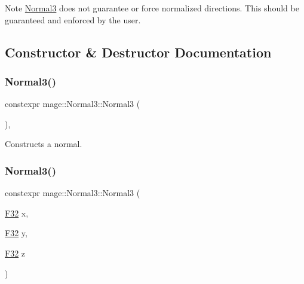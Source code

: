 \begin{DoxyNote}{Note}
{\ttfamily \mbox{\hyperlink{structmage_1_1_normal3}{Normal3}}} does not guarantee or force normalized directions. This should be guaranteed and enforced by the user. 
\end{DoxyNote}


\subsection{Constructor \& Destructor Documentation}
\mbox{\label{structmage_1_1_normal3_a31cd202f6cda288c0b4702e232007b39}} 
\subsubsection{\texorpdfstring{Normal3()}{Normal3()}\hspace{0.1cm}{\footnotesize\ttfamily [1/5]}}
{\footnotesize\ttfamily constexpr mage\+::\+Normal3\+::\+Normal3 (\begin{DoxyParamCaption}{ }\end{DoxyParamCaption})\hspace{0.3cm}{\ttfamily [default]}, {\ttfamily [noexcept]}}

Constructs a normal. \mbox{\label{structmage_1_1_normal3_a7ff657d4eea97a894d0ee7ad3cb02a16}} 
\subsubsection{\texorpdfstring{Normal3()}{Normal3()}\hspace{0.1cm}{\footnotesize\ttfamily [2/5]}}
{\footnotesize\ttfamily constexpr mage\+::\+Normal3\+::\+Normal3 (\begin{DoxyParamCaption}\item[{\mbox{\hyperlink{namespacemage_aa97e833b45f06d60a0a9c4fc22ae02c0}{F32}}}]{x,  }\item[{\mbox{\hyperlink{namespacemage_aa97e833b45f06d60a0a9c4fc22ae02c0}{F32}}}]{y,  }\item[{\mbox{\hyperlink{namespacemage_aa97e833b45f06d60a0a9c4fc22ae02c0}{F32}}}]{z }\end{DoxyParamCaption})\hspace{0.3cm}{\ttfamily [noexcept]}}

